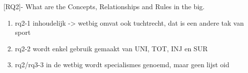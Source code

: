 [RQ2]- What are the Concepts, Relationships and Rules in the \acrshort{big}.
\begin{enumerate}
    \item rq2-1 inhoudelijk -> wetbig omvat ook tuchtrecht, dat is een andere tak van sport
    \item rq2-2 wordt enkel gebruik gemaakt van UNI, TOT, INJ en SUR
    \item rq2/rq3-3 in de wetbig wordt specialismes genoemd, maar geen lijst oid
\end{enumerate}
